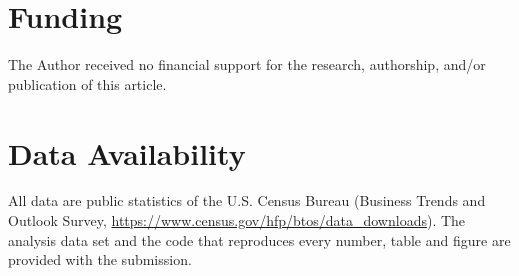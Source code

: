 \documentclass[Afour,sageh,times]{sagej}
\theoremstyle{definition}
\begin{document}
\section*{Funding}
The Author received no financial support for the research, authorship, and/or publication of this article.

\section*{Data Availability}
All data are public statistics of the U.S. Census Bureau (Business Trends and Outlook Survey, \url{https://www.census.gov/hfp/btos/data_downloads}). The analysis data set and the code that reproduces every number, table and figure are provided with the submission.



\end{document}
